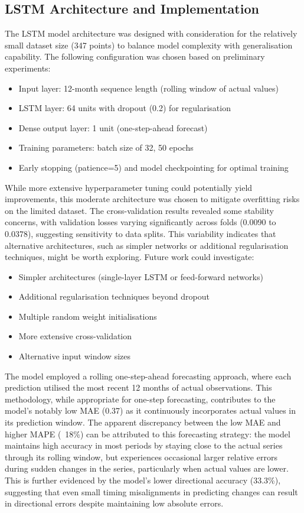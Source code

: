 \documentclass[12pt,a4paper]{report}
\begin{document}
\subsection{LSTM Architecture and Implementation}
\label{subsection:lstm_architecture}
The LSTM model architecture was designed with consideration for the relatively small 
dataset size (347 points) to balance model complexity with generalisation capability. 
The following configuration was chosen based on preliminary experiments:
\begin{itemize}
    \item Input layer: 12-month sequence length (rolling window of actual values)
    \item LSTM layer: 64 units with dropout (0.2) for regularisation
    \item Dense output layer: 1 unit (one-step-ahead forecast)
    \item Training parameters: batch size of 32, 50 epochs
    \item Early stopping (patience=5) and model checkpointing for optimal training
\end{itemize}

While more extensive hyperparameter tuning could potentially yield improvements, 
this moderate architecture was chosen to mitigate overfitting risks on the limited 
dataset. The cross-validation results revealed some stability concerns, with 
validation losses varying significantly across folds (0.0090 to 0.0378), suggesting 
sensitivity to data splits. This variability indicates that alternative architectures, 
such as simpler networks or additional regularisation techniques, might be worth 
exploring. Future work could investigate:
\begin{itemize}
    \item Simpler architectures (single-layer LSTM or feed-forward networks)
    \item Additional regularisation techniques beyond dropout
    \item Multiple random weight initialisations
    \item More extensive cross-validation
    \item Alternative input window sizes
\end{itemize}

The model employed a rolling one-step-ahead forecasting approach, where each prediction 
utilised the most recent 12 months of actual observations. This methodology, while 
appropriate for one-step forecasting, contributes to the model's notably low MAE 
(0.37) as it continuously incorporates actual values in its prediction window. 
The apparent discrepancy between the low MAE and higher MAPE (~18\%) can be 
attributed to this forecasting strategy: the model maintains high accuracy in 
most periods by staying close to the actual series through its rolling window, 
but experiences occasional larger relative errors during sudden changes in the 
series, particularly when actual values are lower. This is further evidenced by 
the model's lower directional accuracy (33.3\%), suggesting that even small 
timing misalignments in predicting changes can result in directional errors 
despite maintaining low absolute errors.
\end{document}
